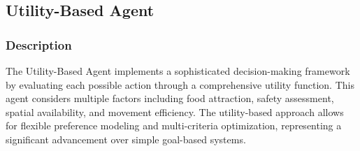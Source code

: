 \documentclass[11pt,a4paper]{article}
\begin{document}
\subsection{Utility-Based Agent}

\subsubsection{Description}
The Utility-Based Agent implements a sophisticated decision-making framework by evaluating each possible action through a comprehensive utility function. This agent considers multiple factors including food attraction, safety assessment, spatial availability, and movement efficiency. The utility-based approach allows for flexible preference modeling and multi-criteria optimization, representing a significant advancement over simple goal-based systems.
\end{document}
